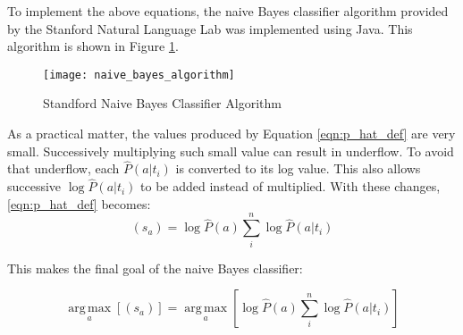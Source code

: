 		To implement the above equations, the naive Bayes classifier algorithm provided by the Stanford Natural Language Lab \cite{_naive_????} was implemented using Java.  This algorithm is shown in Figure \ref{fig:naive_bayes_algorithm}.
		\begin{figure}[htbp!]
			\begin{center}
			\centering
			\texttt{[image: naive\_bayes\_algorithm]}
			\caption{Standford Naive Bayes Classifier Algorithm}
			\label{fig:naive_bayes_algorithm}
			\end{center}
		\end{figure}
		
		As a practical matter, the values produced by Equation \ref{eqn:p_hat_def} are very small.  Successively multiplying such small value can result in underflow.  To avoid that underflow, each $\hat{P}(a|t_i)$ is converted to its log value.  This also allows successive $\log \hat{P}(a|t_i)$ to be added instead of multiplied.  With these changes, \ref{eqn:p_hat_def} becomes:
		\begin{equation} (s_a) = \log{\hat{P}(a)} \sum_i^n \log{\hat{P}(a|t_i)} \end{equation}
		
		This makes the final goal of the naive Bayes classifier:
		
		\begin{equation} \operatorname*{arg\,max}_a [ (s_a)] = \operatorname*{arg\,max}_a [ \log{\hat{P}(a)} \sum_i^n \log{\hat{P}(a|t_i)} ] \end{equation}

